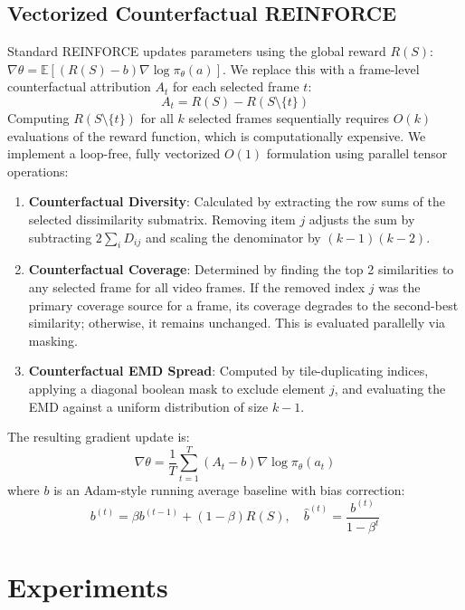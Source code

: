 \documentclass[letterpaper]{article} %
\begin{document}
\subsection{Vectorized Counterfactual REINFORCE}
Standard REINFORCE updates parameters using the global reward $R(S)$: $\nabla \theta = \mathbb{E}[(R(S) - b) \nabla \log \pi_\theta(a)]$. We replace this with a frame-level counterfactual attribution $A_t$ for each selected frame $t$:
\begin{equation}
    A_t = R(S) - R(S \setminus \{t\})
\end{equation}
Computing $R(S \setminus \{t\})$ for all $k$ selected frames sequentially requires $O(k)$ evaluations of the reward function, which is computationally expensive. We implement a loop-free, fully vectorized $O(1)$ formulation using parallel tensor operations:
\begin{enumerate}
    \item \textbf{Counterfactual Diversity}: Calculated by extracting the row sums of the selected dissimilarity submatrix. Removing item $j$ adjusts the sum by subtracting $2 \sum_i D_{ij}$ and scaling the denominator by $(k-1)(k-2)$.
    \item \textbf{Counterfactual Coverage}: Determined by finding the top 2 similarities to any selected frame for all video frames. If the removed index $j$ was the primary coverage source for a frame, its coverage degrades to the second-best similarity; otherwise, it remains unchanged. This is evaluated parallelly via masking.
    \item \textbf{Counterfactual EMD Spread}: Computed by tile-duplicating indices, applying a diagonal boolean mask to exclude element $j$, and evaluating the EMD against a uniform distribution of size $k-1$.
\end{enumerate}
The resulting gradient update is:
\begin{equation}
    \nabla \theta = \frac{1}{T} \sum_{t=1}^T (A_t - b) \nabla \log \pi_\theta(a_t)
\end{equation}
where $b$ is an Adam-style running average baseline with bias correction:
\begin{equation}
    b^{(t)} = \beta b^{(t-1)} + (1 - \beta) R(S), \quad \hat{b}^{(t)} = \frac{b^{(t)}}{1 - \beta^t}
\end{equation}

\section{Experiments}
\end{document}
